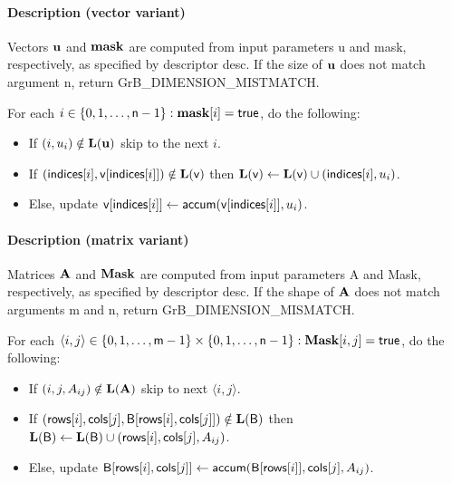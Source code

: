 \paragraph{Description (vector variant)}

Vectors ${\bf u}$ and ${\bf mask}$ are computed from input parameters {\sf u} and {\sf mask}, respectively, as specified by descriptor {\sf desc}. If
the size of ${\bf u}$ does not match argument {\sf n}, return {\sf GrB\_DIMENSION\_MISTMATCH}.

For each $i \in \{0, 1, \ldots, {\sf n}-1 \} : {\bf mask}[i] = {\sf true}$, do the following:
\begin{itemize}
	\item[] If $(i, u_i) \notin \bold{L}({\bf u})$ skip to the next $i$.
	\item[] If $({\sf indices}[i], {\sf v}[{\sf indices}[i]]) \notin \bold{L}({\sf v})$ then
	      $\bold{L}({\sf v}) \leftarrow \bold{L}({\sf v}) \cup ({\sf indices}[i],u_i)$.
	\item[] Else, update ${\sf v}[{\sf indices}[i]] \leftarrow {\sf accum}({\sf v}[{\sf indices}[i]],u_i)$.
\end{itemize}

\paragraph{Description (matrix variant)}

Matrices ${\bf A}$ and ${\bf Mask}$ are computed from input parameters {\sf A} and {\sf Mask}, respectively,
as specified by descriptor {\sf desc}. If the shape of ${\bf A}$ does not match arguments {\sf m} and {\sf n},
return {\sf GrB\_DIMENSION\_MISMATCH}.

For each $\langle i,j \rangle \in \{0, 1, \ldots, {\sf m}-1 \} \times \{0, 1, \ldots, {\sf n}-1 \} : {\bf Mask}[i,j] = {\sf true}$, do the following:
\begin{itemize}
	\item[] If $(i,j,A_{ij}) \notin \bold{L}({\bf A})$ skip to next $\langle i,j \rangle$.
	\item[] If $({\sf rows}[i], {\sf cols}[j], {\sf B}[{\sf rows}[i],{\sf cols}[j]]) \notin \bold{L}({\sf B})$ then
	      $\bold{L}({\sf B}) \leftarrow \bold{L}({\sf B}) \cup ({\sf rows}[i],{\sf cols}[j],A_{ij})$.
	\item[]  Else, update ${\sf B}[{\sf rows}[i],{\sf cols}[j]] \leftarrow {\sf accum}({\sf B}[{\sf rows}[i]],{\sf cols}[j],A_{ij})$.
\end{itemize}

